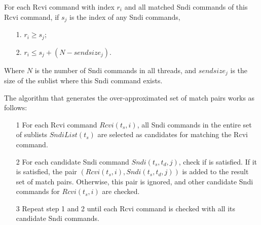 \begin{lemma}
For each Rcvi command with index $r_i$ and all matched Sndi commands of this Rcvi command, if $s_j$ is the index of any Sndi commands,
\begin{itemize}
\item[1.] $r_i \geq s_j$;
\item[2.] $r_i \leq s_j + (N - sendsize_j)$.
\end{itemize}
Where $N$ is the number of Sndi commands in all threads, and $sendsize_j$ is the size of the sublist where this Sndi command exists.
\label{lemma:Rcvi_Sndi_index}
\end{lemma}



The algorithm that generates the over-approximated set of match pairs works as follows:
\begin{itemize}
\item[1] For each Rcvi command $Rcvi(t_s, i)$, all Sndi commands in the entire set of sublists $SndiList(t_s)$ are selected as candidates for matching the Rcvi command.
\item[2] For each candidate Sndi command $Sndi(t_s, t_d, j)$, check if  is satisfied. If it is satisfied, the pair $(Rcvi(t_s, i), Sndi(t_s, t_d, j))$ is added to the result set of match pairs. Otherwise, this pair is ignored, and other candidate Sndi commands for $Rcvi(t_s, i)$ are checked.
\item[3] Repeat step 1 and 2 until each Rcvi command is checked with all its candidate Sndi commands.
\end{itemize}

